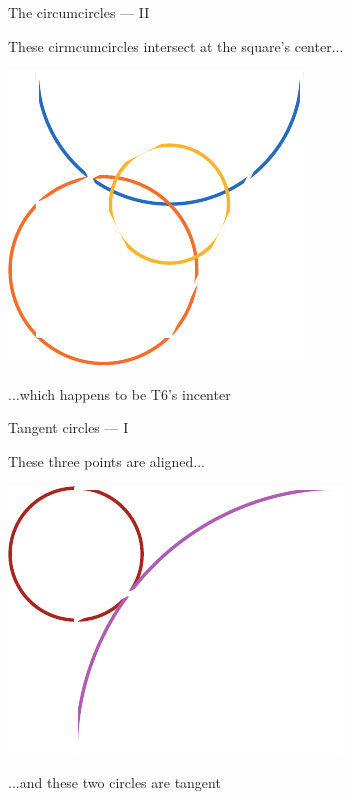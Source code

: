 \documentclass[14pt]{beamer}
\begin{document}

    \begin{frame}{The circumcircles --- II}
        \begin{center}
            These cirmcumcircles intersect at the square's center...
        \end{center}
        \vspace{0.90em}
        \hspace{5.25em} \includegraphics[scale=1.0]{figures/figure019g.pdf} \\
        \begin{center}
            ...which happens to be T6's incenter
        \end{center}
    \end{frame}


    \begin{frame}{Tangent circles --- I}
        \begin{center}
            These three points are aligned...
        \end{center}
        \hspace{3.92em} \includegraphics[scale=1.0]{figures/figure019d.pdf} \\
        \begin{center}
             ...and these two circles are tangent
        \end{center}
    \end{frame}
\end{document}
